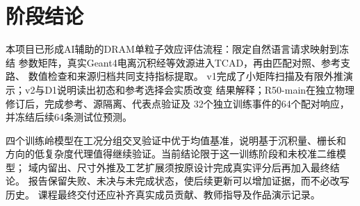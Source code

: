 \section{阶段结论}
\label{cr:conclusion}
本项目已形成AI辅助的DRAM单粒子效应评估流程：限定自然语言请求映射到冻结
参数矩阵，真实Geant4电离沉积经等效源进入TCAD，再由匹配对照、参考支路、
数值检查和来源归档共同支持指标提取。
v1完成了小矩阵扫描及有限外推演示；v2与D1说明读出初态和参考选择会实质改变
结果解释；R50-main在独立物理修订后，完成参考、源隔离、代表点验证及
32个独立训练事件的64个配对响应，并冻结后续64条测试位预测。

四个训练岭模型在工况分组交叉验证中优于均值基准，说明基于沉积量、栅长和
方向的低复杂度代理值得继续验证。当前结论限于这一训练阶段和未校准二维模型；
域内留出、尺寸外推及工艺扩展须按原设计完成真实评分后再加入最终结论。
报告保留失败、未决与未完成状态，使后续更新可以增加证据，而不必改写历史。
课程最终交付还应补齐真实成员贡献、教师指导及作品演示记录。
